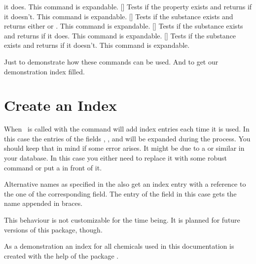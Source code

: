 \documentclass[load-preamble+]{cnltx-doc}
\begin{document}
\begin{commands}
    it does. This command is expandable.
  \expandable{}[]
    Tests if the property  exists and returns  if
    it doesn't. This command is expandable.
  \expandable{}[]
    Tests if the substance  exists and returns either  or . This command is expandable.
  \expandable{}[]
    Tests if the substance  exists and returns  if
    it does. This command is expandable.
  \expandable{}[]
    Tests if the substance  exists and returns  if
    it doesn't. This command is expandable.
\end{commands}

\begin{example}
  Just to demonstrate how these commands can be used. And to get
  our demonstration index filled.\par
\end{example}

\section{Create an Index}\label{sec:index}
When \substances\ is called with  the command 
will add index entries each time it is used. In this case the entries of the
fields , ,  and  will be
expanded during the process. You should keep that in mind if some error
arises. It might be due to a  or similar in your database. In this
case you either need to replace it with some robust command or put a
 in front of it.

Alternative names as specified in the  also get an index entry
with a reference to the one of the corresponding  field. The
entry of the  field in this case gets the  name
appended in braces.

This behaviour is not customizable for the time being. It is planned for future
versions of this package, though.

As a demonstration an index for all chemicals used in this documentation is
created with the help of the package .
\end{document}
